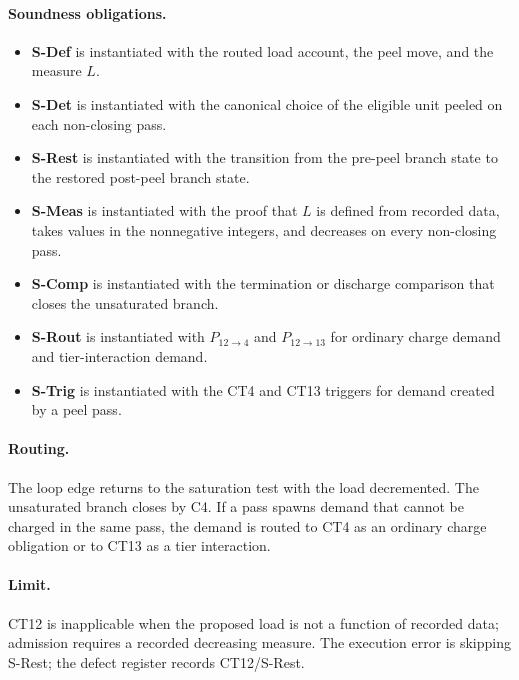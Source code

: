 \documentclass[
  11pt,
]{article}
\providecommand{\tightlist}{%
  \setlength{\itemsep}{0pt}\setlength{\parskip}{0pt}}
\theoremstyle{definition}
\newcommand{\ctpar}[1]{\paragraph{#1.}}
\begin{document}
\ctpar{Soundness obligations}
\begin{itemize}
\tightlist
\item \textbf{S-Def} is instantiated with the routed load account, the peel move, and the measure \(L\).
\item \textbf{S-Det} is instantiated with the canonical choice of the eligible unit peeled on each non-closing pass.
\item \textbf{S-Rest} is instantiated with the transition from the pre-peel branch state to the restored post-peel branch state.
\item \textbf{S-Meas} is instantiated with the proof that \(L\) is defined from recorded data, takes values in the nonnegative integers, and decreases on every non-closing pass.
\item \textbf{S-Comp} is instantiated with the termination or discharge comparison that closes the unsaturated branch.
\item \textbf{S-Rout} is instantiated with \(P_{12\to4}\) and \(P_{12\to13}\) for ordinary charge demand and tier-interaction demand.
\item \textbf{S-Trig} is instantiated with the CT4 and CT13 triggers for demand created by a peel pass.
\end{itemize}

\ctpar{Routing}
The loop edge returns to the saturation test with the load decremented.
The unsaturated branch closes by C4.  If a pass spawns demand that cannot
be charged in the same pass, the demand is routed to CT4 as an ordinary
charge obligation or to CT13 as a tier interaction.

\ctpar{Limit}
CT12 is inapplicable when the proposed load is not a function of recorded
data; admission requires a recorded decreasing measure. The execution
error is skipping S-Rest; the defect register records CT12/S-Rest.
\end{document}
